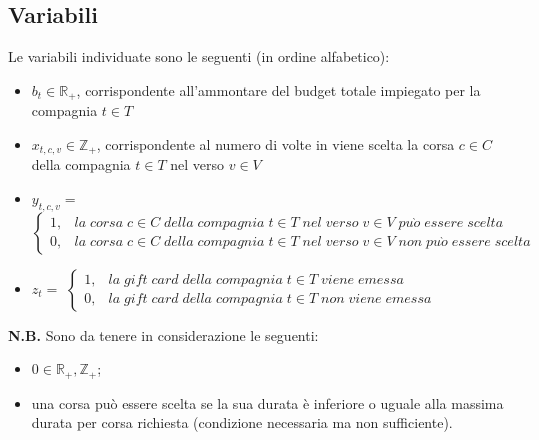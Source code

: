 \documentclass[main.tex]{subfiles}
\begin{document}
\subsection{Variabili}
Le variabili individuate sono le seguenti (in ordine alfabetico):
\begin{itemize}
    \item $b_t \in \mathbb{R}_+$, corrispondente all'ammontare del budget totale impiegato per la compagnia $t \in T$
    \item $x_{t,c,v} \in \mathbb{Z}_+$, corrispondente al numero di volte in viene scelta la corsa $c \in C$ della compagnia $t \in T$ nel verso $v \in V$
    \item $y_{t,c,v} =$
    \begin{math} { \begin{cases}
        1, & la\; corsa\; \text{$c \in C$}\; della\; compagnia\; \text{$t \in T$}\; nel\; verso\; \text{$v \in V$}\; pu\grave{o}\; essere\; scelta \\
        0, & la\; corsa\; \text{$c \in C$}\; della\; compagnia\; \text{$t \in T$}\; nel\; verso\; \text{$v \in V$}\; non\; pu\grave{o}\; essere\; scelta
    \end{cases} } \end{math}
    \item $z_t =$
    \begin{math} { \begin{cases}
        1, & la\; gift\; card\; della\; compagnia\; \text{$t \in T$}\; viene\; emessa \\
        0, & la\; gift\; card\; della\; compagnia\; \text{$t \in T$}\; non\; viene\; emessa 
    \end{cases} } \end{math}
\end{itemize}
\textbf{N.B.} Sono da tenere in considerazione le seguenti:
\begin{itemize}
    \item $0 \in \mathbb{R}_+, \mathbb{Z}_+$;
    \item una corsa può essere scelta se la sua durata è inferiore o uguale alla massima durata per corsa richiesta (condizione necessaria ma non sufficiente).
\end{itemize}
\end{document}
